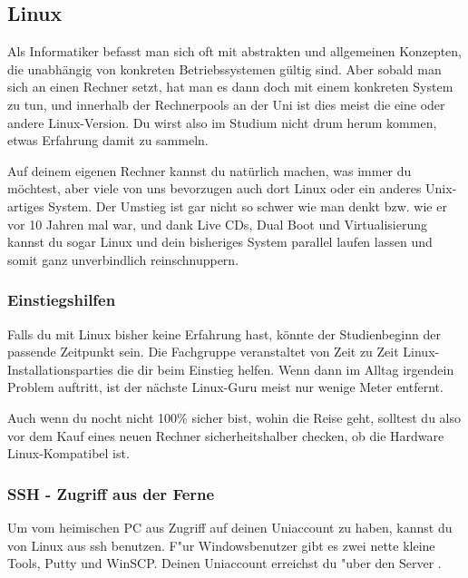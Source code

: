 \subsection{Linux}
\label{linux}
Als Informatiker befasst man sich oft mit abstrakten und allgemeinen 
Konzepten, die unabhängig von konkreten Betriebssystemen gültig sind. 
Aber sobald man sich an einen Rechner setzt, hat man es dann doch mit 
einem konkreten System zu tun, und innerhalb der Rechnerpools an der Uni
ist dies meist die eine oder andere Linux-Version. Du wirst also im 
Studium nicht drum herum kommen, etwas Erfahrung damit zu sammeln.

Auf deinem eigenen Rechner kannst du natürlich machen,
was immer du möchtest, aber viele von uns bevorzugen auch dort Linux
oder ein anderes Unix-artiges System. Der Umstieg ist gar nicht so
schwer wie man denkt bzw. wie er vor 10 Jahren mal war, und dank Live CDs,
Dual Boot und Virtualisierung kannst du sogar Linux und dein bisheriges 
System parallel laufen lassen und somit ganz unverbindlich reinschnuppern.

\subsubsection{Einstiegshilfen}
Falls du mit Linux bisher keine Erfahrung hast, könnte der Studienbeginn
 der passende Zeitpunkt sein. Die Fachgruppe veranstaltet von Zeit zu Zeit 
Linux-Installationsparties die dir beim Einstieg helfen. Wenn dann im Alltag
irgendein Problem auftritt, ist der nächste Linux-Guru meist nur wenige
Meter entfernt.

Auch wenn du nocht nicht 100\% sicher bist, wohin die Reise geht, solltest 
du also vor dem Kauf eines neuen Rechner sicherheitshalber checken, ob die 
Hardware Linux-Kompatibel ist.


\subsubsection{SSH - Zugriff aus der Ferne}
Um vom heimischen PC aus Zugriff auf deinen Uniaccount zu haben, kannst
du von Linux aus ssh benutzen. F"ur Windowsbenutzer gibt es zwei nette
kleine Tools, Putty und WinSCP. Deinen Uniaccount erreichst du "uber
den Server .%

